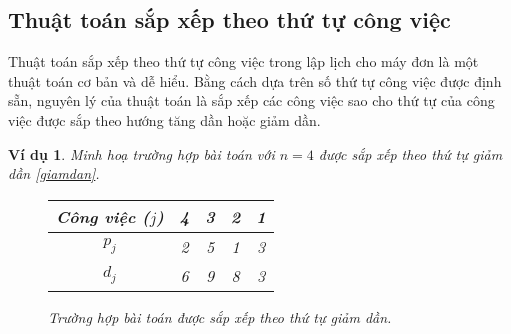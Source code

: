 \documentclass[12pt,a4paper]{report}
\newtheorem{vd}{Ví dụ}
\begin{document}
\subsection{Thuật toán sắp xếp theo thứ tự công việc}
Thuật toán sắp xếp theo thứ tự công việc trong lập lịch cho máy đơn là một thuật toán cơ bản và dễ hiểu. Bằng cách dựa trên số thứ tự công việc được định sẵn, nguyên lý của thuật toán là sắp xếp các công việc sao cho thứ tự của công việc được sắp theo hướng tăng dần hoặc giảm dần.

\begin{vd}
	Minh hoạ trường hợp bài toán với $n=4$ được sắp xếp theo thứ tự giảm dần \eqref{giamdan}.
	
	\begin{figure}[h!]
	\centering
	\begin{tabular}{|c | c c c c |} 
		\hline
		Công việc ($j$) & 4 & 3 & 2 & 1 \\
		\hline\hline
		$p_j$ & 2 & 5 & 1 & 3 \\
		$d_j$ & 6 & 9 & 8 & 3 \\
		\hline
	\end{tabular}
	\caption{\label{giamdan} Trường hợp bài toán được sắp xếp theo thứ tự giảm dần.}
	\end{figure}
\end{vd}
	
\end{document}

